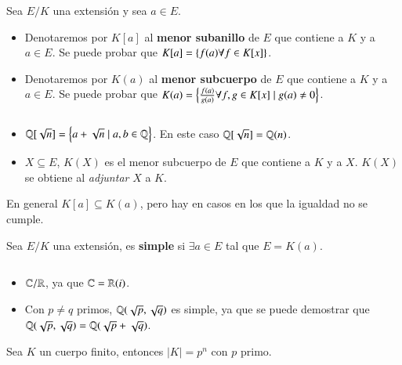 \begin{dfn}Sea $E/K$ una extensión y sea $a \in E$.
    \begin{itemize}
        \item Denotaremos por $K[a]$ al \textbf{menor subanillo} de $E$ que contiene a $K$ y a $a \in E$. Se puede probar que $K[a] = \left\{f(a) \forall f \in K[x]\right\}$.
        \item Denotaremos por $K(a)$ al \textbf{menor subcuerpo} de $E$ que contiene a $K$ y a $a \in E$. Se puede probar que $K(a) = \left\{\frac{f(a)}{g(a)} \forall f,g \in K[x] \mid g(a) \neq 0\right\}$.
    \end{itemize}
\end{dfn}

\begin{eg}$ $
    \begin{itemize}
        \item $\mathbb{Q}[\sqrt{n}] = \left\{a + \sqrt{n} \mid a, b\in \mathbb{Q}\right\}$. En este caso $\mathbb{Q}[\sqrt{n}] = \mathbb{Q}(n)$.
        \item $X \subseteq E$, $K(X)$ es el menor subcuerpo de $E$ que contiene a $K$ y a $X$. $K(X)$ se obtiene al \textit{adjuntar} $X$ a $K$.
    \end{itemize}
\end{eg}

\begin{obs}
    En general $K[a] \subseteq K(a)$, pero hay en casos en los que la igualdad no se cumple.
\end{obs}

\begin{dfn}
    Sea $E/K$ una extensión, es \textbf{simple} si $\exists a \in E$ tal que $E = K(a)$.
\end{dfn}

\begin{eg}$ $
    \begin{itemize}
        \item $\mathbb{C}/\mathbb{R}$, ya que $\mathbb{C} = \mathbb{R}(i)$.
        \item Con $p\neq q$ primos, $\mathbb{Q}(\sqrt{p}, \sqrt{q})$ es simple, ya que se puede demostrar que $\mathbb{Q}(\sqrt{p}, \sqrt{q}) = \mathbb{Q}(\sqrt{p} + \sqrt{q})$.
    \end{itemize}
\end{eg}

\begin{pro}
    Sea $K$ un cuerpo finito, entonces $|K| = p^n$ con $p$ primo.
\end{pro}

